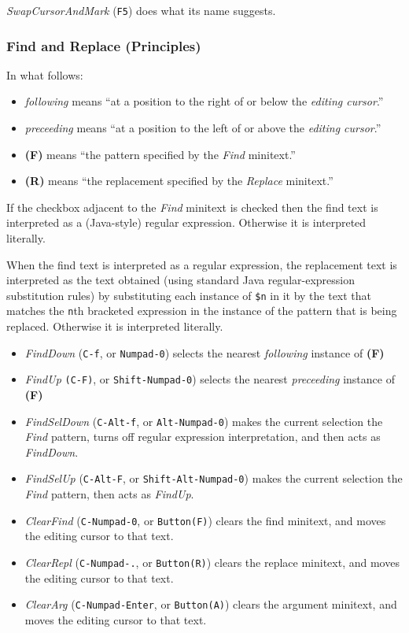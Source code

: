 \documentclass[11pt,a4paper]{article}
\begin{document}
\emph{SwapCursorAndMark} (\texttt{F5}) does what its name suggests.

\hypertarget{find-and-replace-principles}{%
\subsubsection{Find and Replace
(Principles)}\label{find-and-replace-principles}}

In what follows:

\begin{itemize}
\item
  \emph{following} means ``at a position to the right of or below the
  \emph{editing cursor}.''
\item
  \emph{preceeding} means ``at a position to the left of or above the
  \emph{editing cursor}.''
\item
  \textbf{(F)} means ``the pattern specified by the \emph{Find}
  minitext.''
\item
  \textbf{(R)} means ``the replacement specified by the \emph{Replace}
  minitext.''
\end{itemize}

If the checkbox adjacent to the \emph{Find} minitext is checked then the
find text is interpreted as a (Java-style) regular expression. Otherwise
it is interpreted literally.

When the find text is interpreted as a regular expression, the
replacement text is interpreted as the text obtained (using standard
Java regular-expression substitution rules) by substituting each
instance of \texttt{\$n} in it by the text that matches the \texttt{n}th
bracketed expression in the instance of the pattern that is being
replaced. Otherwise it is interpreted literally.

\begin{itemize}
\item
  \emph{FindDown} (\texttt{C-f}, or \texttt{Numpad-0}) selects the
  nearest \emph{following} instance of \textbf{(F)}
\item
  \emph{FindUp} \texttt{(C-F)}, or \texttt{Shift-Numpad-0}) selects the
  nearest \emph{preceeding} instance of \textbf{(F)}
\item
  \emph{FindSelDown} (\texttt{C-Alt-f}, or \texttt{Alt-Numpad-0}) makes
  the current selection the \emph{Find} pattern, turns off regular
  expression interpretation, and then acts as \emph{FindDown}.
\item
  \emph{FindSelUp} (\texttt{C-Alt-F}, or \texttt{Shift-Alt-Numpad-0})
  makes the current selection the \emph{Find} pattern, then acts as
  \emph{FindUp}.
\item
  \emph{ClearFind} (\texttt{C-Numpad-0}, or \texttt{Button(F)}) clears
  the find minitext, and moves the editing cursor to that text.
\item
  \emph{ClearRepl} (\texttt{C-Numpad-.}, or \texttt{Button(R)}) clears
  the replace minitext, and moves the editing cursor to that text.
\item
  \emph{ClearArg} (\texttt{C-Numpad-Enter}, or \texttt{Button(A)})
  clears the argument minitext, and moves the editing cursor to that
  text.
\end{itemize}
\end{document}
